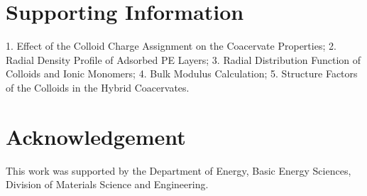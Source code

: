 \documentclass[journal=mamobx, manuscript=article]{achemso}
\begin{document}
\section*{Supporting Information}
1. Effect of the Colloid Charge Assignment on the Coacervate Properties; 2. Radial Density Profile of Adsorbed PE Layers; 3. Radial Distribution Function of Colloids and Ionic Monomers; 
4. Bulk Modulus Calculation; 5. Structure Factors of the Colloids in the Hybrid Coacervates.

\section*{Acknowledgement}
This work was supported by the Department of Energy, Basic Energy Sciences, Division of Materials Science and Engineering.



\end{document}
